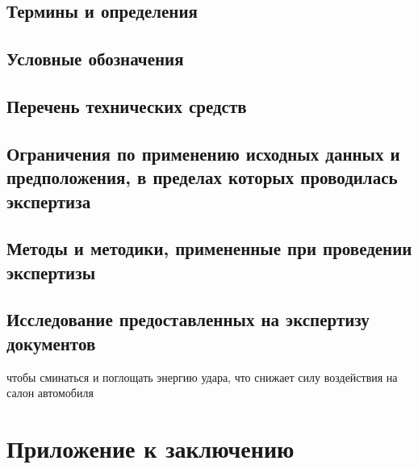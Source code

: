 \subsection{Термины и определения}
%

\subsection{Условные обозначения}
%

\subsection{Перечень технических средств}
%

\subsection{Ограничения по применению исходных данных и предположения, в пределах которых проводилась экспертиза}
%


\subsection{Методы и методики, примененные при проведении экспертизы}
%


\subsection{Исследование предоставленных на экспертизу документов}
%

чтобы сминаться и поглощать энергию удара, что снижает силу воздействия на салон автомобиля


%



%



\appendix
\section{Приложение к заключению} 
%










 
